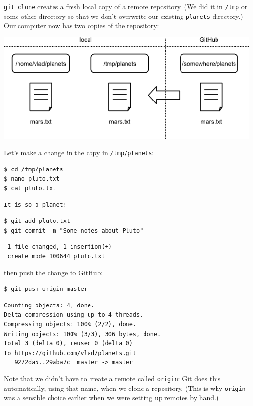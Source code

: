 \documentclass{book}
\begin{document}
\texttt{git clone} creates a fresh local copy of a remote repository.
(We did it in \texttt{/tmp} or some other directory so that we don't
overwrite our existing \texttt{planets} directory.) Our computer now has
two copies of the repository:

\includegraphics{novice/git/img/git-after-duplicate-clone.png}

Let's make a change in the copy in \texttt{/tmp/planets}:

\begin{verbatim}
$ cd /tmp/planets
$ nano pluto.txt
$ cat pluto.txt
\end{verbatim}

\begin{verbatim}
It is so a planet!
\end{verbatim}

\begin{verbatim}
$ git add pluto.txt
$ git commit -m "Some notes about Pluto"
\end{verbatim}

\begin{verbatim}
 1 file changed, 1 insertion(+)
 create mode 100644 pluto.txt
\end{verbatim}

then push the change to GitHub:

\begin{verbatim}
$ git push origin master
\end{verbatim}

\begin{verbatim}
Counting objects: 4, done.
Delta compression using up to 4 threads.
Compressing objects: 100% (2/2), done.
Writing objects: 100% (3/3), 306 bytes, done.
Total 3 (delta 0), reused 0 (delta 0)
To https://github.com/vlad/planets.git
   9272da5..29aba7c  master -> master
\end{verbatim}

Note that we didn't have to create a remote called \texttt{origin}: Git
does this automatically, using that name, when we clone a repository.
(This is why \texttt{origin} was a sensible choice earlier when we were
setting up remotes by hand.)
\end{document}
